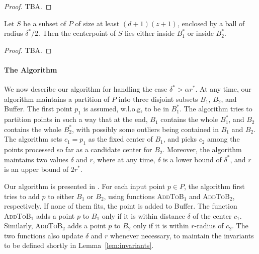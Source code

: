 \documentclass[envcountsame]{cls/cccg15}
\newcommand{\rc}{r}
\newcommand{\dz}{(d + 1)(z + 1)}
\newcommand{\textproc}{\textsc}
\begin{document}
\begin{proof}
	TBA.
\end{proof}

\begin{lemma}
\label{lem:}
	Let $S$ be a subset of $P$ of size at least $\dz$,
	enclosed by a ball of radius $\delta^* / 2$.
	Then the centerpoint of $S$ lies either inside $B_1^{*}$ or inside $B_2^{*}$.
\end{lemma}

\begin{proof}
	TBA.
\end{proof}

\paragraph{The Algorithm}
We now describe our algorithm for handling the case  $\delta^* > \alpha r^*$.
At any time, our algorithm maintains a partition of $P$ into three disjoint subsets
$B_1$, $B_2$, and Buffer.
The first point $p_1$ is assumed, w.l.o.g, to be in $B_1^*$. 
The algorithm tries to partition points in such a way that 
at the end,
$B_1$ contains the whole $B_1^*$, and $B_2$ contains the whole $B_2^*$,
with possibly some outliers being contained in $B_1$ and $B_2$.
The algorithm sets $c_1 = p_1$ as the fixed center of $B_1$,
and picks $c_2$ among the points processed so far as a candidate center for $B_2$.
Moreover, the algorithm maintains two values $\delta$ and $r$,
where at any time, $\delta$ is a lower bound of $\delta^*$, 
and $r$ is an upper bound of $2r^*$.

Our algorithm is presented in .
For each input point $p \in P$, the algorithm first tries 
to add $p$ to either $B_1$ or $B_2$,
using functions \textproc{AddToB$_1$} and \textproc{AddToB$_2$}, respectively.
If none of them fits, the point is added to Buffer.
The function \textproc{AddToB$_1$} adds a point $p$ to $B_1$
only if it is within distance $\delta$ of the center $c_1$.
Similarly, \textproc{AddToB$_2$} adds a point $p$ to $B_2$
only if it is within $\rc$-radius of $c_2$. 
The two functions also update $\delta$ and $\rc$ whenever necessary,
to maintain the invariants to be defined shortly in Lemma~\ref{lem:invariants}.
\end{document}
